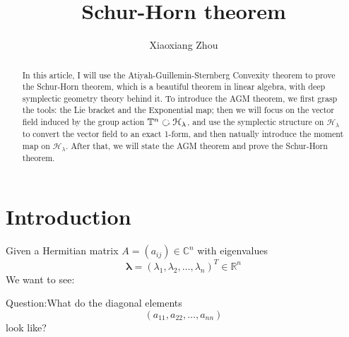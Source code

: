 \documentclass[11pt]{amsart}
\numberwithin{equation}{section}
\theoremstyle{plain}
\theoremstyle{plain}
\numberwithin{equation}{section}
\theoremstyle{remark}
\begin{document}
\date{}

\title
{Schur-Horn theorem}


\author{Xiaoxiang Zhou}
\address{School of Mathematical Sciences\\
University of Science and Technology of China\\
Hefei, 230026\\ P.R. China\\} 





\begin{abstract}
In this article, I will use the Atiyah-Guillemin-Sternberg Convexity theorem to prove the Schur-Horn theorem, which is a beautiful theorem in linear algebra, with deep symplectic geometry theory behind it. To introduce the AGM theorem, we first grasp the tools: the Lie bracket and the Exponential map; then we will focus on the vector field induced by the group action $\mathbb{T}^n  \text{ \rotatebox[origin=c]{270}{$\circlearrowleft$} } \mathcal{H}_\lambda$, and use the symplectic structure on $\mathcal{H}_\lambda$ to convert the vector field to an exact 1-form, and then natually introduce the moment map on $\mathcal{H}_\lambda$. After that, we will state the AGM theorem and prove the Schur-Horn theorem.
\end{abstract}

\maketitle
\vspace{-1cm}%
\section{Introduction}
Given a Hermitian matrix $A=(a_{ij})\in \mathbb{C}^n$
with eigenvalues
$$\bm{\lambda} = (\lambda_1,\lambda_2,\ldots,\lambda_n)^T \in \mathbb{R}^n$$
We want to see:


Question:What do the diagonal elements
$$(a_{11},a_{22},\ldots,a_{nn})$$  
look like?
\end{document}

